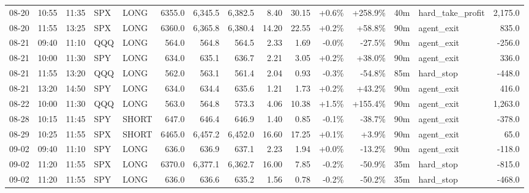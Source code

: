 \documentclass[11pt,a4paper,twoside]{article}
\begin{document}
\begin{landscape}
\begin{center}
\begin{longtable}{>{\color{txtmain}}l l l l l r r r r r r r r >{\color{txtmain}}l r}
08-20 & 10:55 & 11:35 & SPX & LONG & 6355.0 & 6,345.5 & 6,382.5 & 8.40 & 30.15 & \textcolor{wingreen}{+0.6\%} & \textcolor{wingreen}{+258.9\%} & 40m & hard\_take\_profit & \textcolor{wingreen}{2,175.0} \\
08-20 & 11:55 & 13:25 & SPX & LONG & 6360.0 & 6,365.8 & 6,380.4 & 14.20 & 22.55 & \textcolor{wingreen}{+0.2\%} & \textcolor{wingreen}{+58.8\%} & 90m & agent\_exit & \textcolor{wingreen}{835.0} \\
08-21 & 09:40 & 11:10 & QQQ & LONG & 564.0 & 564.8 & 564.5 & 2.33 & 1.69 & \textcolor{lossred}{-0.0\%} & \textcolor{lossred}{-27.5\%} & 90m & agent\_exit & \textcolor{lossred}{-256.0} \\
08-21 & 10:00 & 11:30 & SPY & LONG & 634.0 & 635.1 & 636.7 & 2.21 & 3.05 & \textcolor{wingreen}{+0.2\%} & \textcolor{wingreen}{+38.0\%} & 90m & agent\_exit & \textcolor{wingreen}{336.0} \\
08-21 & 11:55 & 13:20 & QQQ & LONG & 562.0 & 563.1 & 561.4 & 2.04 & 0.93 & \textcolor{lossred}{-0.3\%} & \textcolor{lossred}{-54.8\%} & 85m & hard\_stop & \textcolor{lossred}{-448.0} \\
08-21 & 13:20 & 14:50 & SPY & LONG & 634.0 & 634.4 & 635.6 & 1.21 & 1.73 & \textcolor{wingreen}{+0.2\%} & \textcolor{wingreen}{+43.2\%} & 90m & agent\_exit & \textcolor{wingreen}{416.0} \\
08-22 & 10:00 & 11:30 & QQQ & LONG & 563.0 & 564.8 & 573.3 & 4.06 & 10.38 & \textcolor{wingreen}{+1.5\%} & \textcolor{wingreen}{+155.4\%} & 90m & agent\_exit & \textcolor{wingreen}{1,263.0} \\
08-28 & 10:15 & 11:45 & SPY & SHORT & 647.0 & 646.4 & 646.9 & 1.40 & 0.85 & \textcolor{lossred}{-0.1\%} & \textcolor{lossred}{-38.7\%} & 90m & agent\_exit & \textcolor{lossred}{-378.0} \\
08-29 & 10:25 & 11:55 & SPX & SHORT & 6465.0 & 6,457.2 & 6,452.0 & 16.60 & 17.25 & \textcolor{wingreen}{+0.1\%} & \textcolor{wingreen}{+3.9\%} & 90m & agent\_exit & \textcolor{wingreen}{65.0} \\
09-02 & 09:40 & 11:10 & SPY & LONG & 636.0 & 636.9 & 637.1 & 2.23 & 1.94 & \textcolor{wingreen}{+0.0\%} & \textcolor{lossred}{-13.2\%} & 90m & agent\_exit & \textcolor{lossred}{-118.0} \\
09-02 & 11:20 & 11:55 & SPX & LONG & 6370.0 & 6,377.1 & 6,362.7 & 16.00 & 7.85 & \textcolor{lossred}{-0.2\%} & \textcolor{lossred}{-50.9\%} & 35m & hard\_stop & \textcolor{lossred}{-815.0} \\
09-02 & 11:20 & 11:55 & SPY & LONG & 636.0 & 636.6 & 635.2 & 1.56 & 0.78 & \textcolor{lossred}{-0.2\%} & \textcolor{lossred}{-50.2\%} & 35m & hard\_stop & \textcolor{lossred}{-468.0} \\

\end{longtable}
\end{center}
\end{landscape}
\end{document}
